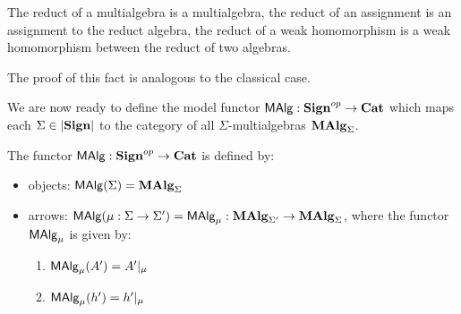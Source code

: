 \documentclass[10pt]{article}
\begin{document}
\begin{fact} The reduct of a multialgebra is a multialgebra, the reduct of an
assignment is an  assignment to the reduct algebra, the reduct of a weak
homomorphism is a weak homomorphism between the reduct of two algebras.%
\end{fact}
The proof of this fact is analogous to the classical case.

We are now ready to define the model functor ${\sf {MAlg}}:{\bf Sign}^{op}\to{\bf Cat}$ which
maps each $\Sigma\in|{\bf Sign}|$ to the category of all $\Sigma$-multialgebras ${\bf MAlg}_{\Sigma}$.
 
\begin{definition}
The functor ${\sf {MAlg}}: {\bf Sign}^{op} \to {\bf Cat}$ is defined by:
\begin{itemize}\MyLPar
\item objects: ${\sf {MAlg}}(\Sigma) = {\bf MAlg}_{\Sigma}$
\item arrows: ${\sf {MAlg}}(\mu:\Sigma \to \Sigma') = {\sf {MAlg}}_\mu :
{\bf MAlg}_{\Sigma'} \to {\bf MAlg}_{\Sigma}$, where the functor ${\sf {MAlg}}_\mu$ is given by:
	\begin{enumerate}\MyLPar
	\item ${\sf {MAlg}}_\mu(A') = A'|_\mu$
	\item ${\sf {MAlg}}_\mu(h') = h'|_\mu$
	\end{enumerate}
\end{itemize}
\end{definition}
\end{document}
